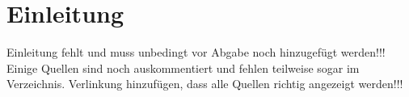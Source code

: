 \documentclass[../../Bachelorarbeit.tex]{subfiles}
\begin{document}
\section{Einleitung}
\color{red}
Einleitung fehlt und muss unbedingt vor Abgabe noch hinzugefügt werden!!!\\

\bigskip
Einige Quellen sind noch auskommentiert und fehlen teilweise sogar im Verzeichnis. Verlinkung hinzufügen, dass alle Quellen richtig angezeigt werden!!!
\end{document}
